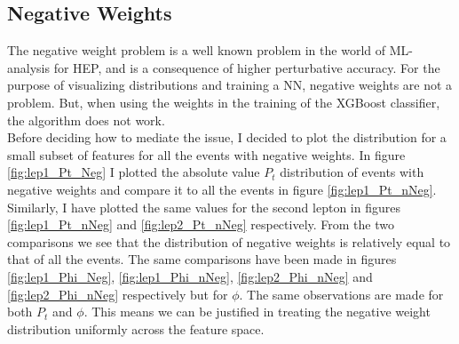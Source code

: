 \subsection{Negative Weights}
The negative weight problem is a well known problem in the world of ML-analysis for HEP, 
and is a consequence of higher perturbative accuracy. For the purpose of visualizing 
distributions and training a \ac{NN}, negative weights are not a problem. But, when using 
the weights in the training of the XGBoost classifier, the algorithm does not work. 
\\
Before deciding how to mediate the issue, I decided to plot the distribution for 
a small subset of features for all the events with negative weights.
In figure \ref{fig:lep1_Pt_Neg} I plotted the absolute value $P_t$ distribution of events with
negative weights and compare it to all the events in figure \ref{fig:lep1_Pt_nNeg}. Similarly,
I have plotted the same values for the second lepton in figures \ref{fig:lep1_Pt_nNeg} and \ref{fig:lep2_Pt_nNeg}
respectively. From the two comparisons we see that the distribution of negative
weights is relatively equal to that of all the events. The same comparisons have
been made in figures \ref{fig:lep1_Phi_Neg}, \ref{fig:lep1_Phi_nNeg}, \ref{fig:lep2_Phi_nNeg}  
and \ref{fig:lep2_Phi_nNeg} respectively but for $\phi$. The same observations
are made for both $P_t$ and $\phi$. This means we can be justified in treating the 
negative weight distribution uniformly across the feature space.
